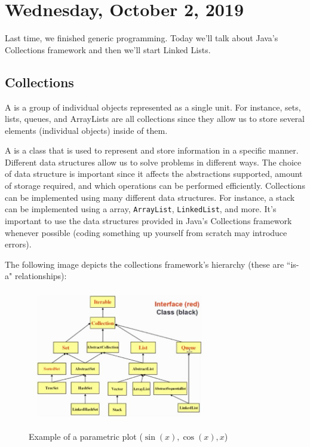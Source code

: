 \section{Wednesday, October 2, 2019}

Last time, we finished generic programming. Today we'll talk about Java's Collections framework and then we'll start Linked Lists.

\subsection{Collections}

A  is a group of individual objects represented as a single unit. For instance, sets, lists, queues, and ArrayLists are all collections since they allow us to store several elements (individual objects) inside of them. 

A  is a class that is used to represent and store information in a specific manner. Different data structures allow us to solve problems in different ways. The choice of data structure is important since it affects the abstractions supported, amount of storage required, and which operations can be performed efficiently. Collections can be implemented using many different data structures. For instance, a stack can be implemented using a array, \verb!ArrayList!, \verb!LinkedList!, and more. It's important to use the data structures provided in Java's Collections framework whenever possible (coding something up yourself from scratch may introduce errors).

The following image depicts the collections framework's hierarchy (these are ``is-a" relationships):

\begin{figure}[h]
\caption{Example of a parametric plot ($\sin (x), \cos(x), x$)}
\centering
\includegraphics[width=0.75\textwidth]{media/hierarchy.jpg}
\end{figure}

